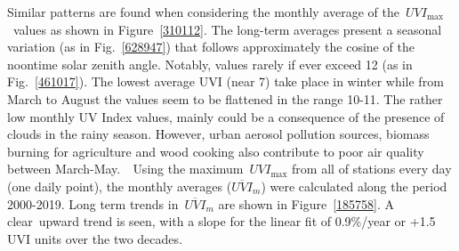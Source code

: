 \documentclass[10pt]{article}
\begin{document}
Similar patterns are found when considering the monthly average of
the~\(UVI_{\max}\)~values as shown in
Figure~{\ref{310112}}. The long-term averages present a
seasonal variation (as in Fig.~{\ref{628947}}) that
follows approximately the cosine of the noontime solar zenith angle.
Notably, values rarely if ever exceed 12 (as in
Fig.~{\ref{461017}}). The lowest average UVI (near 7)
take place in winter while from March to August the values seem to be
flattened in the range 10-11. The rather low monthly UV Index values,
mainly could be a consequence of the presence of clouds in the rainy
season. However, urban aerosol pollution sources, biomass burning for
agriculture and wood cooking also contribute to poor air quality between
March-May\cite{Retama_2015}.~\emph{~}Using the
maximum~\(UVI_{\max}\) from all of stations every day (one daily
point), the monthly averages (\(\overline{UVI}_m\)) were calculated along
the period 2000-2019. Long term trends in~\(\overline{UVI}_m\) are shown
in Figure~{\ref{185758}}. A clear~upward trend is seen,
with a slope for the linear fit of 0.9\%/year or +1.5 UVI units over the
two decades.
\end{document}
